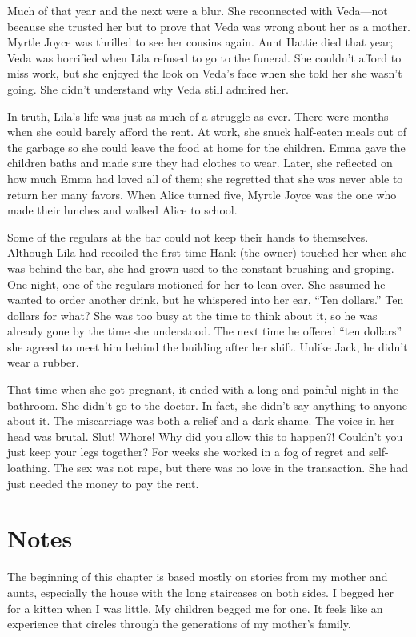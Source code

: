 \documentclass[
  letterpaper,
]{book}
\begin{document}
Much of that year and the next were a blur. She reconnected with
Veda---not because she trusted her but to prove that Veda was wrong
about her as a mother. Myrtle Joyce was thrilled to see her cousins
again. Aunt Hattie died that year; Veda was horrified when Lila refused
to go to the funeral. She couldn't afford to miss work, but she enjoyed
the look on Veda's face when she told her she wasn't going. She didn't
understand why Veda still admired her.

In truth, Lila's life was just as much of a struggle as ever. There were
months when she could barely afford the rent. At work, she snuck
half-eaten meals out of the garbage so she could leave the food at home
for the children. Emma gave the children baths and made sure they had
clothes to wear. Later, she reflected on how much Emma had loved all of
them; she regretted that she was never able to return her many favors.
When Alice turned five, Myrtle Joyce was the one who made their lunches
and walked Alice to school.

Some of the regulars at the bar could not keep their hands to
themselves. Although Lila had recoiled the first time Hank (the owner)
touched her when she was behind the bar, she had grown used to the
constant brushing and groping. One night, one of the regulars motioned
for her to lean over. She assumed he wanted to order another drink, but
he whispered into her ear, ``Ten dollars.'' Ten dollars for what? She
was too busy at the time to think about it, so he was already gone by
the time she understood. The next time he offered ``ten dollars'' she
agreed to meet him behind the building after her shift. Unlike Jack, he
didn't wear a rubber.

That time when she got pregnant, it ended with a long and painful night
in the bathroom. She didn't go to the doctor. In fact, she didn't say
anything to anyone about it. The miscarriage was both a relief and a
dark shame. The voice in her head was brutal. Slut! Whore! Why did you
allow this to happen?! Couldn't you just keep your legs together? For
weeks she worked in a fog of regret and self-loathing. The sex was not
rape, but there was no love in the transaction. She had just needed the
money to pay the rent.

\section{Notes}\label{notes-55}

The beginning of this chapter is based mostly on stories from my mother
and aunts, especially the house with the long staircases on both sides.
I begged her for a kitten when I was little. My children begged me for
one. It feels like an experience that circles through the generations of
my mother's family.
\end{document}
